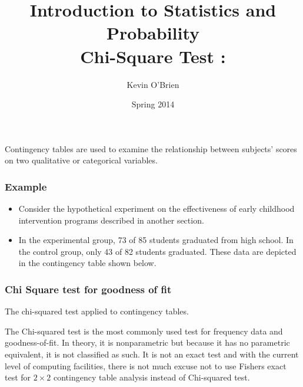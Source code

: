 \documentclass[a4]{beamer}
\title[Stats-Lab.com]{\LARGE Introduction to Statistics and Probability \\ {\Large Chi-Square Test : }}
\author[Kevin O'Brien]{Kevin O'Brien}
\date{Spring 2014}
\begin{document}
\begin{frame}
\titlepage
\end{frame}

\begin{frame}
	Contingency tables are used to examine the relationship between subjects' scores on two qualitative or categorical variables. 
	
\end{frame}

\begin{frame}
	\frametitle{Example}
	\begin{itemize}
		\item Consider the hypothetical experiment on the effectiveness of early childhood intervention programs described in another section.
		\item In the experimental group, 73 of 85 students graduated from high school. In the control group, only 43 of 82 students graduated. These data are depicted in the contingency table shown below.
	\end{itemize}
\end{frame}

\begin{frame}
	\frametitle{Chi Square test for goodness of fit}
	The chi-squared test applied to contingency tables.
	
The Chi-squared test is the most commonly used test for frequency data and goodness-of-fit. In theory, it is nonparametric but because it has no parametric equivalent, it is not classified as such. It is not an exact test and with the current level of computing facilities, there is not much excuse not to use Fishers exact test for $2\times2$ contingency table analysis instead of Chi-squared test. 
	
\end{frame}
\end{document}
